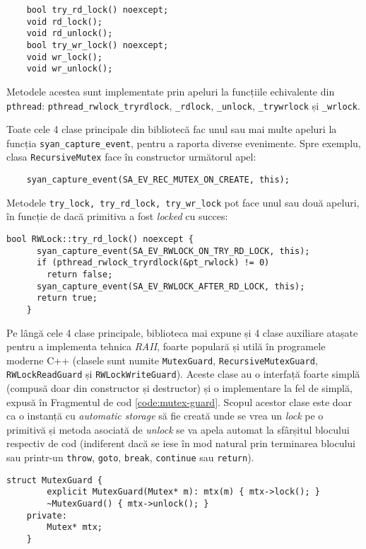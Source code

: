 \begin{lstlisting}
    bool try_rd_lock() noexcept;
    void rd_lock();
    void rd_unlock();
    bool try_wr_lock() noexcept;
    void wr_lock();
    void wr_unlock();
\end{lstlisting}
Metodele acestea sunt implementate prin apeluri la funcțiile
echivalente din \lstinline{pthread}:
\lstinline{pthread_rwlock_tryrdlock}, \lstinline{_rdlock},
\lstinline{_unlock}, \lstinline{_trywrlock} și \lstinline{_wrlock}.

Toate cele 4 clase principale din bibliotecă fac unul sau mai multe
apeluri la funcția \lstinline{syan_capture_event}, pentru a raporta
diverse evenimente. Spre exemplu, clasa \lstinline{RecursiveMutex} face
în constructor următorul apel:
\begin{lstlisting}
    syan_capture_event(SA_EV_REC_MUTEX_ON_CREATE, this);
\end{lstlisting}
Metodele \lstinline{try_lock, try_rd_lock, try_wr_lock} pot face unul
sau două apeluri, în funcție de dacă primitiva a fost \textit{locked} cu
succes:
\begin{lstlisting}[caption=Metoda \lstinline{RWLock::try_rd_lock} din
                           \lstinline{cxxsync}]
    bool RWLock::try_rd_lock() noexcept {
      syan_capture_event(SA_EV_RWLOCK_ON_TRY_RD_LOCK, this);
      if (pthread_rwlock_tryrdlock(&pt_rwlock) != 0)
        return false;
      syan_capture_event(SA_EV_RWLOCK_AFTER_RD_LOCK, this);
      return true;
    }
\end{lstlisting}

Pe lângă cele 4 clase principale, biblioteca mai expune și 4 clase
auxiliare atașate pentru a implementa tehnica \textit{RAII}\cite{RAII},
foarte populară și utilă în programele moderne C++ (clasele sunt numite
\lstinline{MutexGuard}, \lstinline{RecursiveMutexGuard},
\lstinline{RWLockReadGuard} și \lstinline{RWLockWriteGuard}). Aceste
clase au o interfață foarte simplă (compusă doar din constructor și
destructor) și o implementare la fel de simplă, expusă în Fragmentul de
cod \ref{code:mutex-guard}. Scopul acestor clase este doar ca o instanță
cu \textit{automatic storage} să fie creată unde se vrea un
\textit{lock} pe o primitivă și metoda asociată de \textit{unlock} se va
apela automat la sfârșitul blocului respectiv de cod (indiferent dacă se
iese în mod natural prin terminarea blocului sau printr-un
\lstinline{throw}, \lstinline{goto}, \lstinline{break},
\lstinline{continue} sau \lstinline{return}).
\begin{lstlisting}[caption=Clasa \lstinline{MutexGuard} din
                           \lstinline{cxxsync},
                   label=code:mutex-guard]
    struct MutexGuard {
        explicit MutexGuard(Mutex* m): mtx(m) { mtx->lock(); }
        ~MutexGuard() { mtx->unlock(); }
    private:
        Mutex* mtx;
    }
\end{lstlisting}

